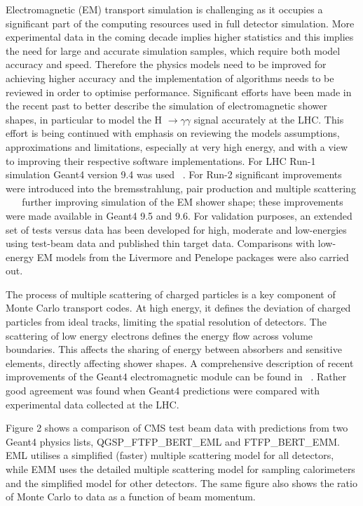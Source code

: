 \documentclass[12pt,a4paper]{article}
\begin{document}
Electromagnetic (EM) transport simulation is challenging as it occupies
a significant part of the computing resources used in full detector
simulation. More experimental data in the coming decade implies higher
statistics and this implies the need for large and accurate simulation
samples, which require both model accuracy and speed. Therefore the
physics models need to be improved for achieving higher accuracy and the
implementation of algorithms needs to be reviewed in order to optimise
performance. Significant efforts have been made in the recent past to
better describe the simulation of electromagnetic shower shapes, in
particular to model the H $\rightarrow \gamma \gamma $ 
signal accurately at the LHC. This effort is being continued with 
emphasis on reviewing the
models assumptions, approximations and limitations, especially at very
high energy, and with a view to improving their respective software
implementations. For LHC Run-1 simulation Geant4 version 9.4 was used
~\cite{1742-6596-331-3-032029}. For Run-2 significant improvements were introduced into the
bremsstrahlung, pair production and multiple scattering 
~\cite{1742-6596-396-2-022013} ~\cite{1742-6596-513-2-022015}
further improving simulation of the EM shower shape; these improvements
were made available in Geant4 9.5 and 9.6. For validation purposes, an
extended set of tests versus data has been developed for high, moderate
and low-energies using test-beam data and published thin target data.
Comparisons with low-energy EM models from the Livermore and Penelope
packages were also carried out.

The process of multiple scattering of charged particles is a key
component of Monte Carlo transport codes. At high energy, it defines the
deviation of charged particles from ideal tracks, limiting the spatial
resolution of detectors. The scattering of low energy electrons defines
the energy flow across volume boundaries. This affects the sharing of
energy between absorbers and sensitive elements, directly affecting
shower shapes. A comprehensive description of recent improvements of the
Geant4 electromagnetic module can be found in ~\cite{1742-6596-513-2-022015}. Rather good
agreement was found when Geant4 predictions were compared with
experimental data collected at the LHC.

Figure 2 shows a comparison of CMS test beam data with predictions from
two Geant4 physics lists, QGSP\_FTFP\_BERT\_EML and FTFP\_BERT\_EMM. EML
utilises a simplified (faster) multiple scattering model for all
detectors, while EMM uses the detailed multiple scattering model for
sampling calorimeters and the simplified model for other detectors. The
same figure also shows the ratio of Monte Carlo to data as a function of
beam momentum. 
\end{document}
